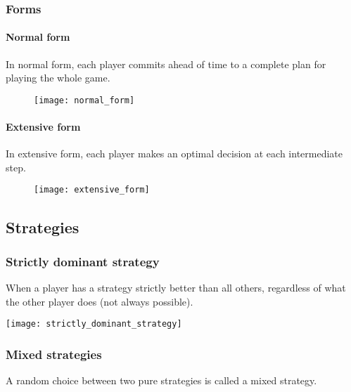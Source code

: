 \subsubsection{Forms}

\paragraph{Normal form}

In normal form, each player commits ahead of time to a complete plan for playing the whole game.

\begin{figure}[H]
    \centering
    \texttt{[image: normal\_form]}
\end{figure}

\newpage
\paragraph{Extensive form}

In extensive form, each player makes an optimal decision at each intermediate step.

\begin{figure}[H]
    \centering
    \texttt{[image: extensive\_form]}
\end{figure}

\subsection{Strategies}

\subsubsection{Strictly dominant strategy}

When a player has a strategy strictly better than all others, regardless of what the other player does (not always possible).

\begin{table}[H]
    \centering
    \texttt{[image: strictly\_dominant\_strategy]}
\end{table}

\subsubsection{Mixed strategies}

A random choice between two pure strategies is called a mixed strategy.

